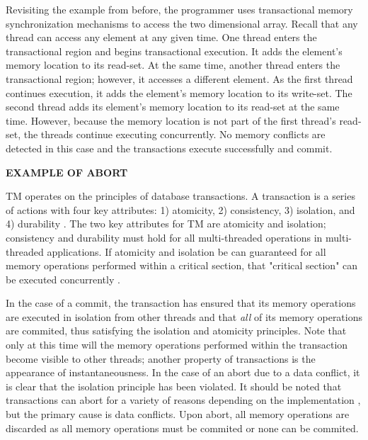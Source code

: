 \documentclass[a4paper]{article}
\begin{document}
\indent
Revisiting the example from before, the programmer uses transactional memory
synchronization mechanisms to access the two dimensional array.  Recall that any
thread can access any element at any given time.  One thread enters the
transactional region and begins transactional execution.  It adds the element's 
memory location to its read-set.  At the same time, another thread enters the
transactional region; however, it accesses a different element.  As the first
thread continues execution, it adds the element's memory location to its write-set.
The second thread adds its element's memory location to its read-set at the same
time.  However, because the memory location is not part of the first thread's
read-set, the threads continue executing concurrently.  No memory conflicts are
detected in this case and the transactions execute successfully and commit.
\par

\indent
\textbf{EXAMPLE OF ABORT}
\par

\indent 
TM operates on the principles of database transactions.  A transaction
is a series of actions with four key attributes: 1) atomicity, 2) consistency,
3) isolation, and 4) durability \cite{tm_2nd}.  The two key attributes for TM
are atomicity and isolation; consistency and durability must hold for all
multi-threaded operations in multi-threaded applications.  If atomicity and
isolation be can guaranteed for all memory operations performed within a
critical section, that "critical section" can be executed concurrently
\cite{sle_rajwar}.
\par 

\indent 
In the case of a commit, the transaction has ensured that its memory
operations are executed in isolation from other threads and that \textit{all} of its
memory operations are commited, thus satisfying the isolation and
atomicity principles.  Note that only at this time will the memory operations
performed within the transaction become visible to other threads; another
property of transactions is the appearance of instantaneousness.  In the case
of an abort due to a data conflict, it is clear that the isolation principle has
been violated.  It should be noted that transactions can abort for a variety of
reasons depending on the implementation \cite{intel_opt_man,chung_amd}, but the
primary cause is data conflicts.  Upon abort, all memory operations are
discarded as all memory operations must be commited or none can be commited.
\par
\end{document}
